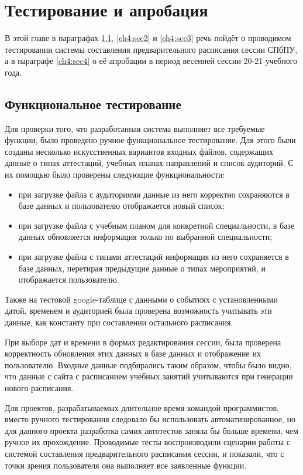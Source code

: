 \chapter{Тестирование и апробация} \label{ch4}

В этой главе в параграфах \ref{ch4:sec1}, \ref{ch4:sec2} и \ref{ch4:sec3} речь пойдёт о проводимом тестировании системы составления предварительного расписания сессии СПбПУ, а в параграфе \ref{ch4:sec4} о её апробации в период весенней сессии 20-21 учебного года.

\section{Функциональное тестирование} \label{ch4:sec1}
Для проверки того, что разработанная система выполняет все требуемые функции, было проведено ручное функциональное тестирование. Для этого были созданы несколько искусственных вариантов входных файлов, содержащих данные о типах аттестаций, учебных планах направлений и список аудиторий. С их помощью было проверены следующие функциональности:
\begin{itemize}
\item при загрузке файла с аудиториями данные из него корректно сохраняются в базе данных и пользователю отображается новый список;
\item при загрузке файла с учебным планом для конкретной специальности, в базе данных обновляется информация только по выбранной специальности;
\item при загрузке файла с типами аттестаций информация из него сохраняется в базе данных, перетирая предыдущие данные о типах мероприятий, и отображается пользователю.
\end{itemize} 	

Также на тестовой google-таблице с данными о событиях с установленными датой, временем и аудиторией была проверена возможность учитывать эти данные, как константу при составлении остального расписания.

При выборе дат и времени в формах редактирования сессии, была проверена корректность обновления этих данных в базе данных и отображение их пользователю. Входные данные подбирались таким образом, чтобы было видно, что данные с сайта с расписанием учебных занятий \cite{ruz} учитываются при генерации нового расписания.

Для проектов, разрабатываемых длительное время командой программистов, вместо ручного тестирования следовало бы использовать автоматизированное, но для данного проекта разработка самих автотестов заняла бы больше времени, чем ручное их прохождение. Проводимые тесты воспроизводили сценарии работы с системой составления предварительного расписания сессии, и показали, что с точки зрения пользователя она выполняет все заявленные функции.

